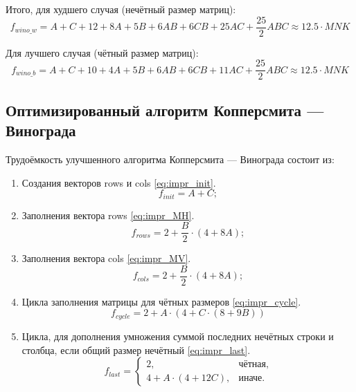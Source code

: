 Итого, для худшего случая (нечётный размер матриц):
\begin{equation}
    \label{eq:bad}
    f_{wino\_w} = A + C + 12 + 8A + 5B + 6AB + 6CB + 25AC + \frac{25}{2}ABC \approx 12.5 \cdot MNK
\end{equation}

Для лучшего случая (чётный размер матриц):
\begin{equation}
    \label{eq:good}
    f_{wino\_b} = A + C + 10 + 4A + 5B + 6AB + 6CB + 11AC + \frac{25}{2}ABC \approx 12.5 \cdot MNK
\end{equation}

\subsection{Оптимизированный алгоритм Копперсмита — Винограда}

Трудоёмкость улучшенного алгоритма Копперсмита — Винограда состоит из:
\begin{enumerate}
    \item Создания векторов rows и cols \eqref{eq:impr_init}.
    \begin{equation}
        \label{eq:impr_init}
        f_{init} = A + C;
    \end{equation}

    \item Заполнения вектора rows \eqref{eq:impr_MH}.
    \begin{equation}
        \label{eq:impr_MH}
        f_{rows} = 2 + \frac{B}{2} \cdot (4 + 8A);
    \end{equation}

    \item Заполнения вектора cols \eqref{eq:impr_MV}.
    \begin{equation}
        \label{eq:impr_MV}
        f_{cols} = 2 + \frac{B}{2} \cdot (4 + 8A);
    \end{equation}

    \item Цикла заполнения матрицы для чётных размеров \eqref{eq:impr_cycle}.
    \begin{equation}
        \label{eq:impr_cycle}
        f_{cycle} = 2 + A \cdot (4 + C \cdot (8 + 9B))
    \end{equation}

    \item Цикла, для дополнения умножения суммой последних нечётных строки и столбца, если общий размер нечётный \eqref{eq:impr_last}.
    \begin{equation}
        \label{eq:impr_last}
        f_{last} =
        \begin{cases}
            2, & \text{чётная,}\\
            4 + A \cdot (4 + 12C), & \text{иначе.}
        \end{cases}
    \end{equation}
\end{enumerate}

